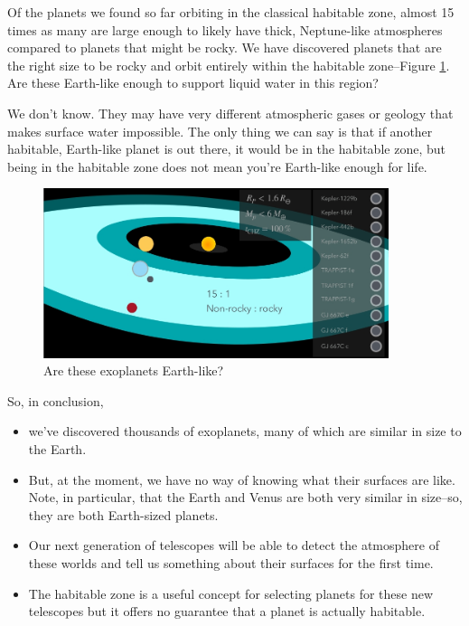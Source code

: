 \documentclass[]{article}
\begin{document}
Of the planets we found so far orbiting
in the classical habitable zone,
almost 15 times as many
are large enough
to likely have thick,
Neptune-like atmospheres
compared to planets that might be rocky.
We have discovered planets
that are the right size to be rocky
and orbit entirely within
the habitable zone--Figure \ref{fig:are:these:earthlike}.
Are these Earth-like enough
to support liquid water in this region?



We don't know.
They may have very different
atmospheric gases
or geology that makes
surface water impossible.
The only thing we can say is that
if another habitable,
Earth-like planet is out there,
it would be in the habitable zone,
but being in the habitable zone
does not mean you're
Earth-like enough for life.

\begin{figure}[H]
	\caption{Are these exoplanets Earth-like?}\label{fig:are:these:earthlike}
	\includegraphics[width=0.9\textwidth]{AreTheseEarthlike}
\end{figure}

So, in conclusion,\begin{itemize}
	\item  we've discovered thousands of exoplanets, many of which are similar in size to the Earth. 
	\item But, at the moment, we have no way of knowing what their surfaces are like. Note, in particular, that the Earth and Venus are both very similar in size--so, they are both Earth-sized planets.
	\item Our next generation of telescopes will be able to detect the atmosphere of these worlds and tell us something about their surfaces for the first time.
	
	\item The habitable zone is a useful concept for selecting planets for these new telescopes but it offers no guarantee that a planet is actually habitable.
\end{itemize}
\end{document}
